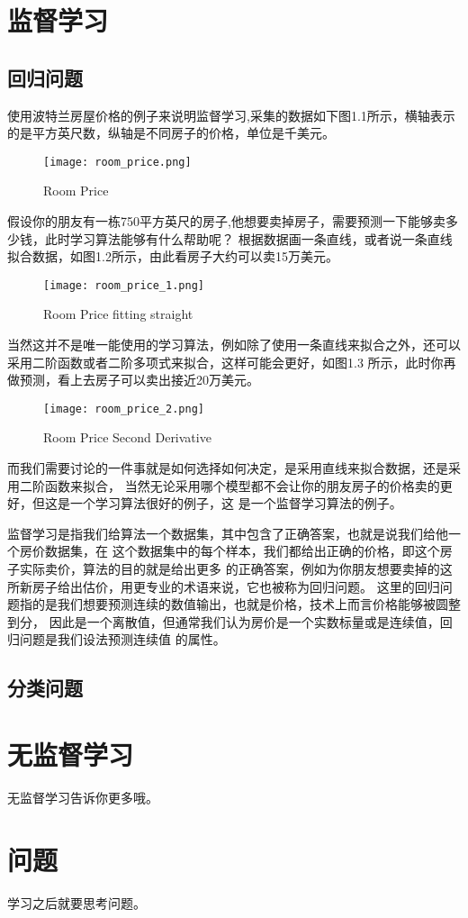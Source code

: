 \section{监督学习}

\subsection{回归问题}
使用波特兰房屋价格的例子来说明监督学习,采集的数据如下图1.1所示，横轴表示的是平方英尺数，纵轴是不同房子的价格，单位是千美元。

\begin{figure}[!hbtp]
\centering
\texttt{[image: room\_price.png]}
\caption{Room Price\label{figur:root_price}}
\end{figure}

假设你的朋友有一栋750平方英尺的房子,他想要卖掉房子，需要预测一下能够卖多少钱，此时学习算法能够有什么帮助呢？
根据数据画一条直线，或者说一条直线拟合数据，如图1.2所示，由此看房子大约可以卖15万美元。
\begin{figure}[H]
\centering
\texttt{[image: room\_price\_1.png]}
\caption{Room Price fitting straight\label{figur:root_price_1}}
\end{figure}

当然这并不是唯一能使用的学习算法，例如除了使用一条直线来拟合之外，还可以采用二阶函数或者二阶多项式来拟合，这样可能会更好，如图1.3
所示，此时你再做预测，看上去房子可以卖出接近20万美元。
\begin{figure}[!hbtp]
\centering
\texttt{[image: room\_price\_2.png]}
\caption{Room Price Second Derivative\label{figur:root_price_2}}
\end{figure}

而我们需要讨论的一件事就是如何选择如何决定，是采用直线来拟合数据，还是采用二阶函数来拟合，
当然无论采用哪个模型都不会让你的朋友房子的价格卖的更好，但这是一个学习算法很好的例子，这
是一个监督学习算法的例子。

监督学习是指我们给算法一个数据集，其中包含了正确答案，也就是说我们给他一个房价数据集，在
这个数据集中的每个样本，我们都给出正确的价格，即这个房子实际卖价，算法的目的就是给出更多
的正确答案，例如为你朋友想要卖掉的这所新房子给出估价，用更专业的术语来说，它也被称为回归问题。
这里的回归问题指的是我们想要预测连续的数值输出，也就是价格，技术上而言价格能够被圆整到分，
因此是一个离散值，但通常我们认为房价是一个实数标量或是连续值，回归问题是我们设法预测连续值
的属性。

\subsection{分类问题}


\section{无监督学习}
无监督学习告诉你更多哦。
\section{问题}
学习之后就要思考问题。